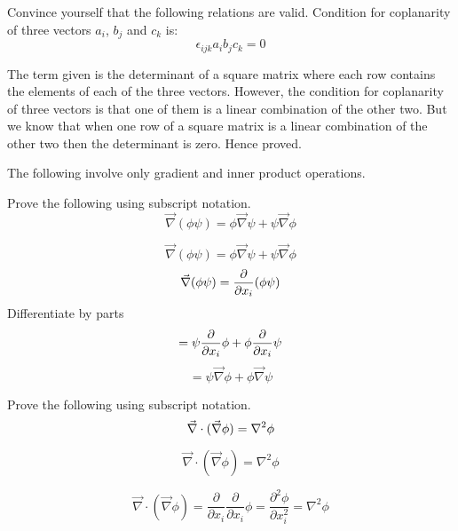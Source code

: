 
\begin{question}
Convince yourself that the following relations are valid.
Condition for coplanarity of three vectors $a_i$, $b_j$ and $c_k$ is:
$$ \epsilon_{ijk} a_i b_j c_k = 0 $$
\end{question}
\begin{solution}[print]
The term given is the determinant of a square matrix where each row contains the elements of each of the three vectors. However, the condition for coplanarity of three vectors is that one of them is a linear combination of the other two. But we know that when one row of a square matrix is a linear combination of the other two then the determinant is zero. Hence proved.
\end{solution}


The following involve only gradient and inner product operations.


\begin{question}
Prove the following using subscript notation.
$$\vec{\nabla}(\phi \psi) = \phi \vec{\nabla} \psi + \psi \vec{\nabla} \phi$$
\end{question} 

\begin{solution}[print]
$$\vec{\nabla}(\phi \psi) = \phi \vec{\nabla} \psi + \psi \vec{\nabla} \phi$$
$$\vec{\nabla}(\phi \psi) = {\partial \over \partial x_i} (\phi \psi) $$
Differentiate by parts
$$ = \psi {\partial \over \partial x_i} \phi  + \phi {\partial \over \partial x_i} \psi $$
$$ = \psi \vec{\nabla} \phi + \phi \vec{\nabla} \psi  $$
\end{solution}


\begin{question}
Prove the following using subscript notation.
$$\vec{\nabla} \cdot(\vec{\nabla} \phi) = \nabla^2\phi$$
\end{question} 
\begin{solution}[print]
$$ \vec{\nabla} \cdot(\vec{\nabla} \phi) = \nabla^2\phi $$

$$ \vec{\nabla} \cdot(\vec{\nabla} \phi) = \frac{\partial}{\partial x_i} \frac{\partial}{\partial x_i} \phi 
= \frac{\partial^2 \phi}{\partial x^2_i} = \nabla^2\phi $$
\end{solution}

